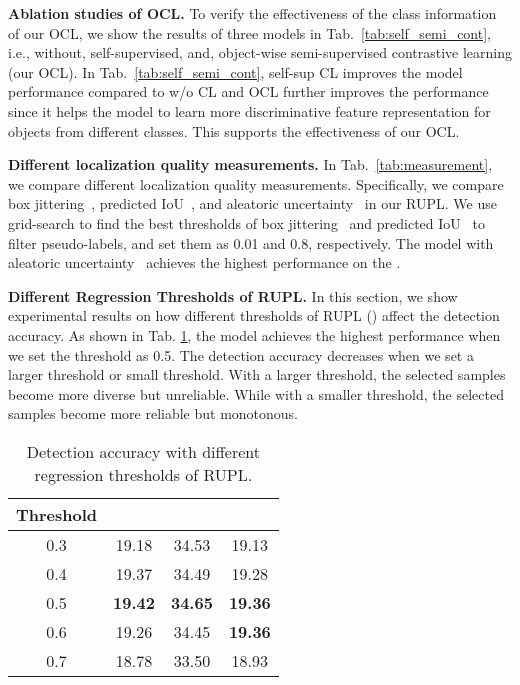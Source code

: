 \documentclass{bmvc2k}
\begin{document}
\noindent\textbf{Ablation studies of OCL.}
To verify the effectiveness of the class information of our OCL,  we show the results of three models in Tab.~\ref{tab:self_semi_cont}, i.e., without, self-supervised, and, object-wise semi-supervised contrastive learning (our OCL).
In Tab.~\ref{tab:self_semi_cont}, self-sup CL improves the model performance compared to w/o CL and
OCL further improves the performance since it helps the model to learn more discriminative feature representation for objects from different classes. This supports the effectiveness of our OCL.

\noindent\textbf{Different localization quality measurements.} In Tab.~\ref{tab:measurement}, we compare different localization quality measurements. 
Specifically, we compare box jittering~\cite{xu2021soft}, predicted IoU~\cite{wang20213dioumatch}, and aleatoric uncertainty~\cite{whatUncertainty} in our RUPL. We use grid-search to find the best thresholds of box jittering~\cite{xu2021soft} and predicted IoU~\cite{wang20213dioumatch} to filter pseudo-labels, and set them as 0.01 and 0.8, respectively.
The model with aleatoric uncertainty~\cite{whatUncertainty} achieves the highest performance on the .

\noindent\textbf{Different Regression Thresholds of RUPL.}
In this section, we show experimental results on how different thresholds of RUPL () affect the detection accuracy. As shown in Tab. \ref{tab:thres_exp}, the model achieves the highest performance when we set the threshold as 0.5. The detection accuracy decreases when we set a larger threshold or small threshold. With a larger threshold, the selected samples become more diverse but unreliable. While with a smaller threshold, the selected samples become more reliable but monotonous.
\begin{table}[h]
    \centering
    \scriptsize
    \begin{tabular}{c|ccc}
        \toprule
        Threshold &  &  &  \\ 
        \midrule
        0.3       & 19.18          & 34.53          & 19.13          \\
        0.4       & 19.37       & 34.49               & 19.28               \\
        0.5       & \textbf{19.42} & \textbf{34.65} & \textbf{19.36} \\
        0.6       & 19.26          & 34.45          & \textbf{19.36}          \\
        0.7       & 18.78          & 33.50          & 18.93          \\
        \bottomrule
    \end{tabular}
    \caption{Detection accuracy with different regression thresholds of RUPL.}
    \label{tab:thres_exp}
\end{table}
\end{document}
